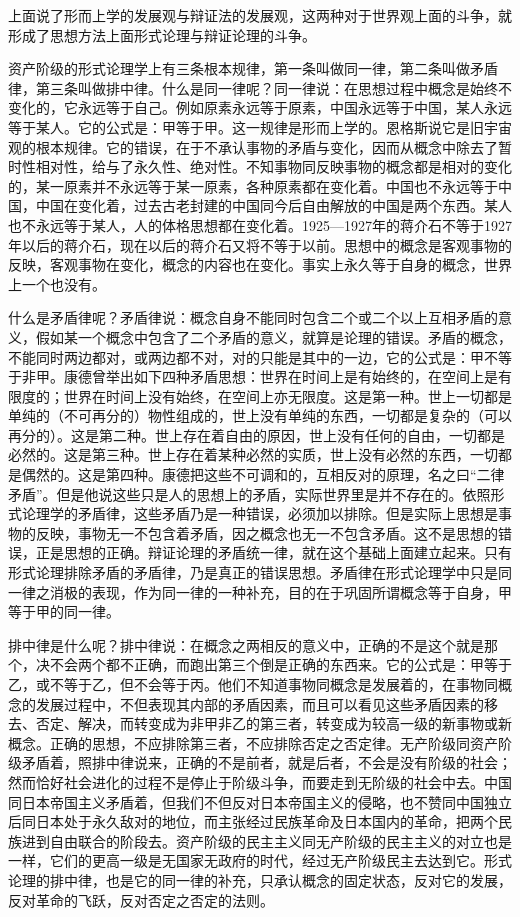 上面说了形而上学的发展观与辩证法的发展观，这两种对于世界观上面的斗争，就形成了思想方法上面形式论理与辩证论理的斗争。

资产阶级的形式论理学上有三条根本规律，第一条叫做同一律，第二条叫做矛盾律，第三条叫做排中律。什么是同一律呢？同一律说：在思想过程中概念是始终不变化的，它永远等于自己。例如原素永远等于原素，中国永远等于中国，某人永远等于某人。它的公式是：甲等于甲。这一规律是形而上学的。恩格斯说它是旧宇宙观的根本规律。它的错误，在于不承认事物的矛盾与变化，因而从概念中除去了暂时性相对性，给与了永久性、绝对性。不知事物同反映事物的概念都是相对的变化的，某一原素并不永远等于某一原素，各种原素都在变化着。中国也不永远等于中国，中国在变化着，过去古老封建的中国同今后自由解放的中国是两个东西。某人也不永远等于某人，人的体格思想都在变化着。1925—1927年的蒋介石不等于1927年以后的蒋介石，现在以后的蒋介石又将不等于以前。思想中的概念是客观事物的反映，客观事物在变化，概念的内容也在变化。事实上永久等于自身的概念，世界上一个也没有。

什么是矛盾律呢？矛盾律说：概念自身不能同时包含二个或二个以上互相矛盾的意义，假如某一个概念中包含了二个矛盾的意义，就算是论理的错误。矛盾的概念，不能同时两边都对，或两边都不对，对的只能是其中的一边，它的公式是：甲不等于非甲。康德曾举出如下四种矛盾思想：世界在时间上是有始终的，在空间上是有限度的；世界在时间上没有始终，在空间上亦无限度。这是第一种。世上一切都是单纯的（不可再分的）物性组成的，世上没有单纯的东西，一切都是复杂的（可以再分的）。这是第二种。世上存在着自由的原因，世上没有任何的自由，一切都是必然的。这是第三种。世上存在着某种必然的实质，世上没有必然的东西，一切都是偶然的。这是第四种。康德把这些不可调和的，互相反对的原理，名之曰“二律矛盾”。但是他说这些只是人的思想上的矛盾，实际世界里是并不存在的。依照形式论理学的矛盾律，这些矛盾乃是一种错误，必须加以排除。但是实际上思想是事物的反映，事物无一不包含着矛盾，因之概念也无一不包含矛盾。这不是思想的错误，正是思想的正确。辩证论理的矛盾统一律，就在这个基础上面建立起来。只有形式论理排除矛盾的矛盾律，乃是真正的错误思想。矛盾律在形式论理学中只是同一律之消极的表现，作为同一律的一种补充，目的在于巩固所谓概念等于自身，甲等于甲的同一律。

排中律是什么呢？排中律说：在概念之两相反的意义中，正确的不是这个就是那个，决不会两个都不正确，而跑出第三个倒是正确的东西来。它的公式是：甲等于乙，或不等于乙，但不会等于丙。他们不知道事物同概念是发展着的，在事物同概念的发展过程中，不但表现其内部的矛盾因素，而且可以看见这些矛盾因素的移去、否定、解决，而转变成为非甲非乙的第三者，转变成为较高一级的新事物或新概念。正确的思想，不应排除第三者，不应排除否定之否定律。无产阶级同资产阶级矛盾着，照排中律说来，正确的不是前者，就是后者，不会是没有阶级的社会；然而恰好社会进化的过程不是停止于阶级斗争，而要走到无阶级的社会中去。中国同日本帝国主义矛盾着，但我们不但反对日本帝国主义的侵略，也不赞同中国独立后同日本处于永久敌对的地位，而主张经过民族革命及日本国内的革命，把两个民族进到自由联合的阶段去。资产阶级的民主主义同无产阶级的民主主义的对立也是一样，它们的更高一级是无国家无政府的时代，经过无产阶级民主去达到它。形式论理的排中律，也是它的同一律的补充，只承认概念的固定状态，反对它的发展，反对革命的飞跃，反对否定之否定的法则。

